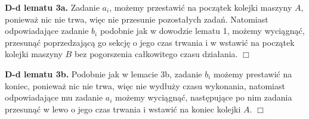\documentclass[11pt, wide]{article}
\begin{document}
    \textbf{D-d lematu 3a.}
    Zadanie $a_i$, możemy przestawić na początek kolejki maszyny $A$, ponieważ nic nie trwa, więc nie
    przesunie pozostałych zadań. Natomiast odpowiadające zadanie $b_i$
    podobnie jak w dowodzie lematu 1, możemy wyciągnąć, przesunąć poprzedzającą go sekcję o jego czas trwania
    i w wstawić na początek kolejki maszyny $B$ bez pogorszenia całkowitego czasu działania.
    \hspace*{12cm} $\Box$

    \textbf{D-d lematu 3b.}
    Podobnie jak w lemacie 3b, zadanie $b_i$ możemy prestawić na koniec, ponieważ nic nie trwa, więc nie wydłuży czasu wykonania,
    natomiast odpowiadające mu zadanie $a_i$ możemy wyciągnąć, następujące po nim zadania przesunąć w lewo o jego czas trwania i 
    wstawić na koniec kolejki $A$.
    \hspace*{12cm} $\Box$

    
\end{document}
